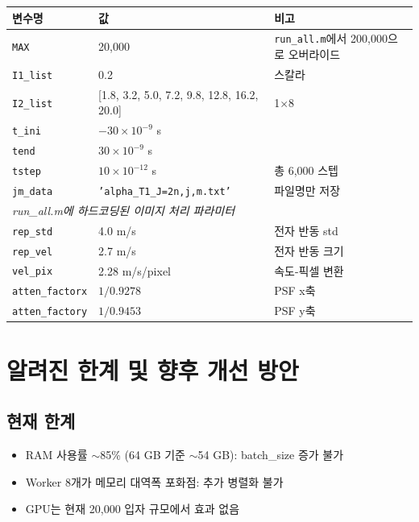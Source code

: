 \documentclass[11pt, a4paper]{article}
\begin{document}
\begin{center}
\begin{tabular}{llp{6cm}}
\toprule
변수명 & 값 & 비고 \\
\midrule
\texttt{MAX}           & 20,000          & \texttt{run\_all.m}에서 200,000으로 오버라이드 \\
\texttt{I1\_list}      & 0.2             & 스칼라 \\
\texttt{I2\_list}      & [1.8, 3.2, 5.0, 7.2, 9.8, 12.8, 16.2, 20.0] & 1$\times$8 \\
\texttt{t\_ini}        & $-30\times10^{-9}$ s & \\
\texttt{tend}          & $30\times10^{-9}$ s & \\
\texttt{tstep}         & $10\times10^{-12}$ s & 총 6,000 스텝 \\
\texttt{jm\_data}      & \texttt{'alpha\_T1\_J=2n,j,m.txt'} & 파일명만 저장 \\
\midrule
\multicolumn{3}{l}{\textit{run\_all.m에 하드코딩된 이미지 처리 파라미터}} \\
\texttt{rep\_std}      & 4.0 m/s         & 전자 반동 std \\
\texttt{rep\_vel}      & 2.7 m/s         & 전자 반동 크기 \\
\texttt{vel\_pix}      & 2.28 m/s/pixel  & 속도-픽셀 변환 \\
\texttt{atten\_factorx}& $1/0.9278$      & PSF x축 \\
\texttt{atten\_factory}& $1/0.9453$      & PSF y축 \\
\bottomrule
\end{tabular}
\end{center}

\section{알려진 한계 및 향후 개선 방안}

\subsection{현재 한계}

\begin{itemize}
  \item RAM 사용률 $\sim$85\% (64 GB 기준 $\sim$54 GB): batch\_size 증가 불가
  \item Worker 8개가 메모리 대역폭 포화점: 추가 병렬화 불가
  \item GPU는 현재 20,000 입자 규모에서 효과 없음
\end{itemize}
\end{document}
